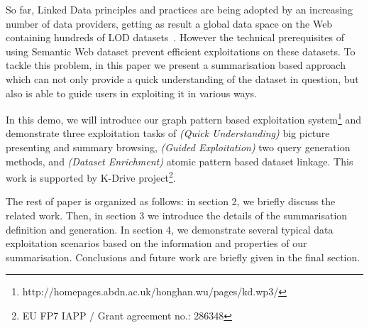 So far, Linked Data principles and practices are being adopted by an increasing number of data providers, getting as result a global data space on the Web containing hundreds of LOD datasets~\cite{bizer2009linked}. However the technical prerequisites of using Semantic Web dataset prevent efficient exploitations on these datasets. To tackle this problem, in this paper we present a summarisation based approach which can not only provide a quick understanding of the dataset in question, but also is able to guide users in exploiting it in various ways.

In this demo, we will introduce our graph pattern based exploitation system\footnote{http://homepages.abdn.ac.uk/honghan.wu/pages/kd.wp3/} and demonstrate three exploitation tasks of \emph{(Quick Understanding)} big picture presenting and summary browsing, \emph{(Guided Exploitation)} two query generation methods, and \emph{(Dataset Enrichment)} atomic pattern based dataset linkage. This work is supported by K-Drive project\footnote{ EU FP7 IAPP / Grant agreement no.: 286348}.

The rest of paper is organized as follows: in section 2, we briefly discuss the related work. Then, in section 3 we  introduce the details of the summarisation definition and generation. In section 4, we demonstrate several typical data exploitation scenarios based on the information and properties of our summarisation. Conclusions and future work are briefly given in the final section.
